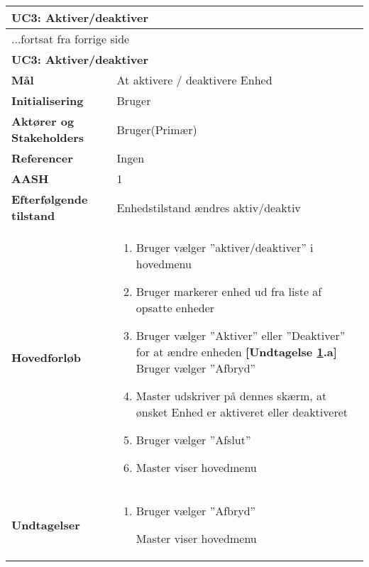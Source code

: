 \begin{center} \centering \label{UC3} 
	\begin{longtable}{|p{5cm}|p{9cm}|}  %
	\hline
		\multicolumn{2}{|l|}{\textbf{UC3: Aktiver/deaktiver}} \\\hline %
		\endfirsthead
		
		\multicolumn{2}{l}{...fortsat fra forrige side} \\ \hline %
		\multicolumn{2}{|l|}{\textbf{UC3: Aktiver/deaktiver}} \\\hline %
		\endhead	
		
		\textbf{Mål}								&At aktivere / deaktivere Enhed	\\\hline
		\textbf{Initialisering}					&Bruger				\\\hline
		\textbf{Aktører og Stakeholders}			&Bruger(Primær)		\\\hline
		\textbf{Referencer}						&Ingen				\\\hline
		\textbf{AASH}							&1					\\\hline
		\textbf{Efterfølgende tilstand}			&Enhedstilstand ændres aktiv/deaktiv\\\hline
		\textbf{Hovedforløb}					
			&\begin{enumerate}
	
	
				\item Bruger vælger ''aktiver/deaktiver'' i hovedmenu
				
				\item Bruger markerer enhed ud fra liste af opsatte enheder
				
				\item \label{uc3aktiver} Bruger vælger ''Aktiver'' eller ''Deaktiver'' for at ændre enheden\newline
				\textbf{[Undtagelse \ref{uc3aktiver}.a]} Bruger vælger ''Afbryd''
				
				\item Master udskriver på dennes skærm, at ønsket Enhed er aktiveret eller deaktiveret		
			
				\item Bruger vælger ''Afslut''
				
				\item Master viser hovedmenu	
	
			\end{enumerate}\\\hline
			
		\textbf{Undtagelser}
			&\begin{enumerate}[label=\ref{uc3aktiver}.a]
				
				\item Bruger vælger ''Afbryd''
				
					\subitem Master viser hovedmenu
			\end{enumerate}\\\hline			
			
	\end{longtable}
\end{center}

